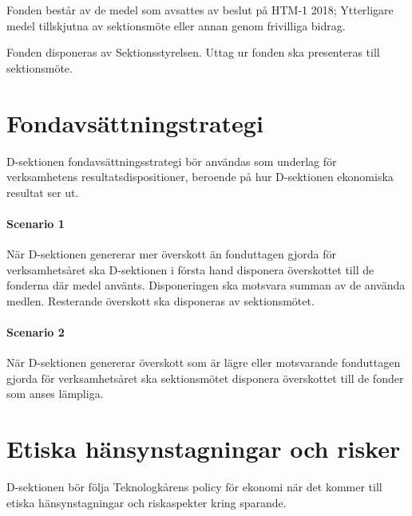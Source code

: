 \documentclass{dsekprotokoll}
\begin{document}
Fonden består av de medel som avsattes av beslut på HTM-1 2018; Ytterligare medel tillskjutna av
sektionsmöte eller annan genom frivilliga bidrag.

Fonden disponeras av Sektionsstyrelsen. Uttag ur fonden ska presenteras till sektionsmöte.

\section{Fondavsättningstrategi}
D-sektionen fondavsättningsstrategi bör användas som underlag för verksamhetens resultatsdispositioner, beroende på hur D-sektionen ekonomiska resultat ser ut.


\paragraph{Scenario 1}  När D-sektionen genererar mer överskott än fonduttagen gjorda för verksamhetsåret ska D-sektionen i första hand disponera överskottet till de fonderna där medel använts.
Disponeringen ska motsvara summan av de använda medlen. Resterande överskott ska disponeras av
sektionsmötet.


\paragraph{Scenario 2} När D-sektionen genererar överskott som är lägre eller motsvarande fonduttagen
gjorda för verksamhetsåret ska sektionsmötet disponera överskottet till de fonder som anses lämpliga.

\section{Etiska hänsynstagningar och risker}

D-sektionen bör följa Teknologkårens policy för ekonomi när det kommer till etiska hänsynstagningar och riskaspekter kring sparande.
\end{document}
